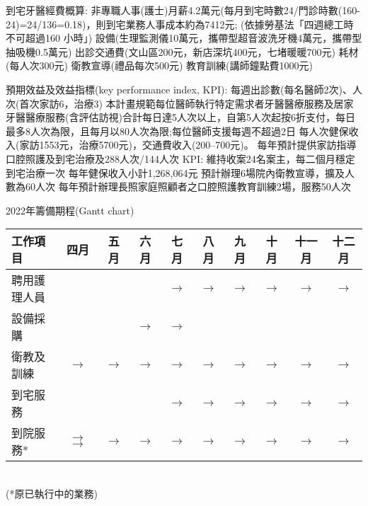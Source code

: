 \begin{outline}
到宅牙醫經費概算:
\1 非專職人事(護士)月薪4.2萬元(每月到宅時數24/門診時數(160-24)=24/136=0.18)，則到宅業務人事成本約為7412元; (依據勞基法「四週總工時不可超過160 小時」) %
\1 設備(生理監測儀10萬元，攜帶型超音波洗牙機4萬元，攜帶型抽吸機0.5萬元) %
\1 出診交通費(文山區200元，新店深坑400元，七堵暖暖700元) %
\1 耗材(每人次300元) %
\1 衛教宣導(禮品每次500元)
\1 教育訓練(講師鐘點費1000元)

\vspace{5mm}
預期效益及效益指標(key performance index, KPI): %
\1 每週出診數(每名醫師2次)、人次(首次家訪6，治療3)
\2 本計畫規範每位醫師執行特定需求者牙醫醫療服務及居家牙醫醫療服務(含評估訪視)合計每日達5人次以上，自第5人次起按6折支付，每日最多8人次為限，且每月以80人次為限;每位醫師支援每週不超過2日
\2 每人次健保收入(家訪1553元，治療5700元)，交通費收入(200--700元)。
\2 每年預計提供家訪指導口腔照護及到宅治療及288人次/144人次
\2 KPI: 維持收案24名案主，每二個月穩定到宅治療一次
\2 每年健保收入小計1,268,064元
\1 預計辦理6場院內衛教宣導，擴及人數為60人次
\1 每年預計辦理長照家庭照顧者之口腔照護教育訓練2場，服務50人次

\end{outline}

2022年籌備期程(Gantt chart)\\
\begin{tabular}{|l|ccccccccc|}
\hline
 工作項目 & 四月 & 五月  & 六月 & 七月  & 八月  & 九月  & 十月  & 十一月  & 十二月  \\
\hline
 聘用護理人員    &  & &  & $\longrightarrow$ & $\longrightarrow$ & $\longrightarrow$ & $\longrightarrow$ & $\longrightarrow$ & $\longrightarrow$  \\
 設備採購    &  &  & $\longrightarrow$ & $\longrightarrow$ & &&&&  \\
 衛教及訓練    & $\longrightarrow$ & $\longrightarrow$ & $\longrightarrow$ & $\longrightarrow$  & $\longrightarrow$ & $\longrightarrow$ & $\longrightarrow$ & $\longrightarrow$ & $\longrightarrow$ \\
 到宅服務    &  & &  & $\longrightarrow$ & $\longrightarrow$ & $\longrightarrow$ & $\longrightarrow$ & $\longrightarrow$ & $\longrightarrow$  \\
 到院服務*  & $\longrightarrow$ $\longrightarrow$ & $\longrightarrow$ & $\longrightarrow$ & $\longrightarrow$  & $\longrightarrow$ & $\longrightarrow$ & $\longrightarrow$ & $\longrightarrow$ & $\longrightarrow$ \\ 
\hline
\end{tabular}\\
(*原已執行中的業務)

